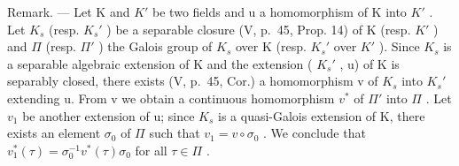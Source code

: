 Remark. --- Let K and \(K'\) be two fields and u a homomorphism of K into \(K'\) . Let \(K_s\) (resp. \(K_s'\) ) be a separable closure (V, p.~45, Prop. 14) of K (resp. \(K'\) ) and \(\Pi\) (resp. \(\Pi'\) ) the Galois group of \(K_s\) over K (resp. \(K_s'\) over \(K'\) ). Since \(K_s\) is a separable algebraic extension of K and the extension ( \(K_s'\) , u) of K is separably closed, there exists (V, p.~45, Cor.) a homomorphism v of \(K_s\) into \(K_s'\) extending u. From v we obtain a continuous homomorphism \(v^*\) of \(\Pi'\) into \(\Pi\) . Let \(v_1\) be another extension of u; since \(K_s\) is a quasi-Galois extension of K, there exists an element \(\sigma_0\) of \(\Pi\) such that \(v_1 = v \circ \sigma_0\) . We conclude that \(v_1^*(\tau) = \sigma_0^{-1} v^*(\tau) \sigma_0\) for all \(\tau \in \Pi\) .

